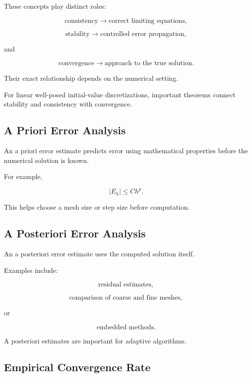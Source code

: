 These concepts play distinct roles:

\[
\boxed{
\text{consistency}
\rightarrow
\text{correct limiting equations},
}
\]

\[
\boxed{
\text{stability}
\rightarrow
\text{controlled error propagation},
}
\]

and

\[
\boxed{
\text{convergence}
\rightarrow
\text{approach to the true solution}.
}
\]

Their exact relationship depends on the numerical setting.

For linear well-posed initial-value discretizations, important theorems
connect stability and consistency with convergence.

\subsection{A Priori Error Analysis}
\label{subsec:a-priori-error-analysis}

An a priori error estimate predicts error using mathematical properties
before the numerical solution is known.

For example,

\[
\boxed{
|E_h|
\leq
Ch^p.
}
\]

This helps choose a mesh size or step size before computation.

\subsection{A Posteriori Error Analysis}
\label{subsec:a-posteriori-error-analysis}

An a posteriori error estimate uses the computed solution itself.

Examples include:

\[
\boxed{
\text{residual estimates},
}
\]

\[
\boxed{
\text{comparison of coarse and fine meshes},
}
\]

or

\[
\boxed{
\text{embedded methods}.
}
\]

A posteriori estimates are important for adaptive algorithms.

\subsection{Empirical Convergence Rate}
\label{subsec:empirical-convergence-rate}

